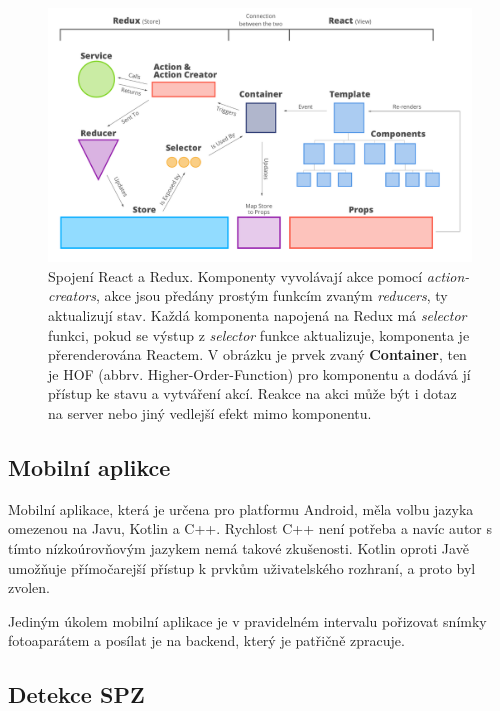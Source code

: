 \begin{figure}[!htb] \centering
\includegraphics[width=145mm]{../img/react-redux-architecture.png}
\caption[Spojení React a Redux.]{Spojení React a Redux. \citep[][]{react_redux_dataflow}
Komponenty vyvolávají akce pomocí \textit{action-creators}, akce jsou předány prostým funkcím zvaným \textit{reducers},
ty aktualizují stav. Každá komponenta napojená
na Redux má \textit{selector} funkci, pokud se výstup z \textit{selector} funkce aktualizuje, komponenta je přerenderována Reactem.
V obrázku je prvek zvaný \textbf{Container}, ten je HOF (abbrv. Higher-Order-Function) pro komponentu a dodává jí přístup ke stavu a vytváření akcí.
Reakce na akci může být i dotaz na server nebo jiný vedlejší efekt mimo komponentu.}
\label{fig:react_redux_dataflow}
\end{figure}

\subsection{Mobilní aplikce} \label{mobile_app}

\noindent
Mobilní aplikace, která je určena pro platformu Android, měla volbu jazyka omezenou na Javu, Kotlin a C++.
Rychlost C++ není potřeba a navíc autor s tímto nízkoúrovňovým jazykem nemá takové zkušenosti.
Kotlin oproti Javě umožňuje přímočarejší přístup k prvkům uživatelského rozhraní, a proto byl zvolen.

Jediným úkolem mobilní aplikace je v pravidelném intervalu pořizovat snímky fotoaparátem a posílat je na
backend, který je patřičně zpracuje.

\subsection{Detekce SPZ}

